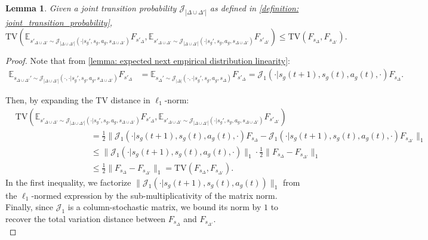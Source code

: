 \documentclass{article}
\theoremstyle{plain}
\newtheorem{lemma}[theorem]{Lemma}
\theoremstyle{definition}
\def\E{\mathbb{E}}
\begin{document}
\begin{lemma}\label{lemma: generalized tvd linear bound} Given a joint transition probability $\mathcal{J}_{|\Delta\cup\Delta'|}$ as defined in \cref{definition: joint_transition_probability}, 
\[\mathrm{TV}(\E_{s'_{\Delta\cup\Delta'}\sim\mathcal{J}_{|\Delta\cup\Delta'|}(\cdot|s_g', s_g, a_g, s_{\Delta\cup\Delta'})} F_{s'_{\Delta}}, \E_{s'_{\Delta\cup\Delta'}\sim\mathcal{J}_{|\Delta\cup\Delta'|}(\cdot|s_g', s_g, a_g, s_{\Delta\cup\Delta'})} F_{s'_{\Delta'}})\leq \mathrm{TV}(F_{s_\Delta}, F_{s_{\Delta'}}).\]
\end{lemma}
\begin{proof}
Note that from \cref{lemma: expected next empirical distribution linearity}:
\begin{align*}\E_{s_{\Delta\cup\Delta'}'\sim\mathcal{J}_{|\Delta\cup\Delta'|}(\cdot,\cdot|s_g', s_g, a_g, s_{\Delta\cup\Delta'})}F_{s'_\Delta} 
&= \E_{s_{\Delta}'\sim\mathcal{J}_{|\Delta|}(\cdot,\cdot|s_g', s_g, a_g, s_{\Delta})} F_{s'_\Delta} = \mathcal{J}_1(\cdot|s_g(t+1),s_g(t),a_g(t),\cdot)F_{s_\Delta}.
\end{align*}

\noindent Then, by expanding the TV distance in $\ell_1$-norm:
    \begin{align*}
        &\mathrm{TV}(\E_{s'_{\Delta\cup\Delta'}\sim\mathcal{J}_{|\Delta\cup\Delta'|}(\cdot|s_g', s_g, a_g, s_{\Delta\cup\Delta'})} F_{s'_{\Delta}}, \E_{s'_{\Delta\cup\Delta'}\sim\mathcal{J}_{|\Delta\cup\Delta'|}(\cdot|s_g', s_g, a_g, s_{\Delta\cup\Delta'})} F_{s'_{\Delta'}}) \\
        &\quad\quad\quad\quad\quad\quad\quad\quad\quad= \frac{1}{2}\|\mathcal{J}_1(\cdot|s_g(t+1),s_g(t),a_g(t),\cdot)F_{s_\Delta} - \mathcal{J}_1(\cdot|s_g(t+1),s_g(t),a_g(t),\cdot)F_{s_{\Delta'}}\|_1 \\
        &\quad\quad\quad\quad\quad\quad\quad\quad\quad\leq \|\mathcal{J}_1(\cdot|s_g(t+1),s_g(t),a_g(t),\cdot)\|_1 \cdot \frac{1}{2}\|F_{s_\Delta}  -  F_{s_{\Delta'}}\|_1 \\
        &\quad\quad\quad\quad\quad\quad\quad\quad\quad \leq \frac{1}{2}\|F_{s_\Delta}  -  F_{s_{\Delta'}}\|_1 = \mathrm{TV}(F_{s_\Delta},F_{s_{\Delta'}}).
    \end{align*}
In the first inequality, we factorize $\|\mathcal{J}_1(\cdot|s_g(t+1),s_g(t), a_g(t))\|_1$ from the $\ell_1$-normed expression by the sub-multiplicativity of the matrix norm. Finally, since $\mathcal{J}_1$ is a column-stochastic matrix, we bound its norm by $1$ to recover the total variation distance between $F_{s_\Delta}$ and $F_{s_{\Delta'}}$. \qedhere\\
\end{proof}
\end{document}
